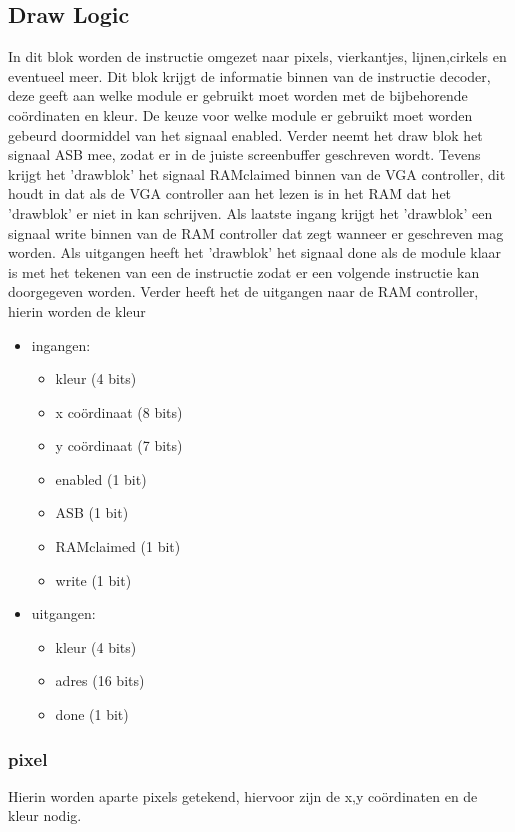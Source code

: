 \subsection{Draw Logic}
In dit blok worden de instructie omgezet naar pixels, vierkantjes, lijnen,cirkels en eventueel meer. Dit blok krijgt de informatie binnen van de instructie decoder, deze geeft aan welke module er gebruikt moet worden met de bijbehorende coördinaten en kleur.
De keuze voor welke module er gebruikt moet worden gebeurd doormiddel van het signaal enabled. Verder neemt het draw blok het signaal ASB mee, zodat er in de juiste screenbuffer geschreven wordt. Tevens krijgt het 'drawblok' het signaal RAMclaimed binnen van de VGA controller, dit houdt in dat als de VGA controller aan het lezen is in het RAM dat het 'drawblok' er niet in kan schrijven. Als laatste ingang krijgt het 'drawblok' een signaal write binnen van de RAM controller dat zegt wanneer er geschreven mag worden.
Als uitgangen heeft het 'drawblok' het signaal done als de module klaar is met het tekenen van een de instructie zodat er een volgende instructie kan doorgegeven worden. Verder heeft het de uitgangen naar de RAM controller, hierin worden de kleur 

\begin {itemize}
\item ingangen:
\begin {itemize}
\item kleur (4 bits)
\item x coördinaat (8 bits)
\item y coördinaat (7 bits)
\item enabled (1 bit)
\item ASB (1 bit)
\item RAMclaimed (1 bit)
\item write (1 bit)
\end {itemize}

\item uitgangen:
\begin {itemize}
\item kleur (4 bits)
\item adres (16 bits)
\item done (1 bit)
\end {itemize}
\end{itemize}

\subsubsection { pixel}
Hierin worden aparte pixels getekend, hiervoor zijn de x,y coördinaten en de kleur nodig.

